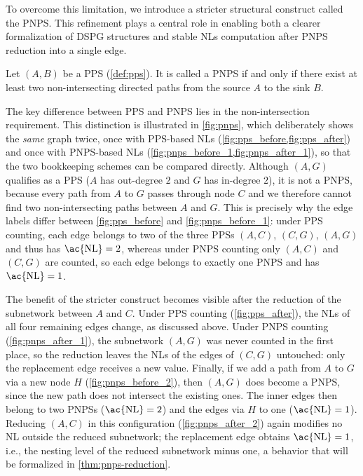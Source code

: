 To overcome this limitation, we introduce a stricter structural construct called the \acf{PNPS}. This refinement plays a central role in enabling both a clearer formalization of \ac{DSPG} structures and stable \acp{NL} computation after \ac{PNPS} reduction into a single edge.

\begin{definition}
\label{def:pnps}
Let $(A,B)$ be a \ac{PPS} (\cref{def:pps}). It is called a \ac{PNPS} if and only if there exist at least two non-intersecting directed paths from the source $A$ to the sink $B$.
\end{definition}
The key difference between \ac{PPS} and \ac{PNPS} lies in the non-intersection requirement. This distinction is illustrated in \cref{fig:pnps}, which deliberately shows the \emph{same} graph twice, once with \ac{PPS}-based \acp{NL} (\cref{fig:pps_before,fig:pps_after}) and once with \ac{PNPS}-based \acp{NL} (\cref{fig:pnps_before_1,fig:pnps_after_1}), so that the two bookkeeping schemes can be compared directly. Although $(A,G)$ qualifies as a \ac{PPS} ($A$ has out-degree $2$ and $G$ has in-degree $2$), it is not a \ac{PNPS}, because every path from $A$ to $G$ passes through node $C$ and we therefore cannot find two non-intersecting paths between $A$ and $G$. This is precisely why the edge labels differ between \cref{fig:pps_before} and \cref{fig:pnps_before_1}: under \ac{PPS} counting, each edge belongs to two of the three \acp{PPS} $(A,C)$, $(C,G)$, $(A,G)$ and thus has $\text{\ac{NL}} = 2$, whereas under \ac{PNPS} counting only $(A,C)$ and $(C,G)$ are counted, so each edge belongs to exactly one \ac{PNPS} and has $\text{\ac{NL}} = 1$.

The benefit of the stricter construct becomes visible after the reduction of the subnetwork between $A$ and $C$. Under \ac{PPS} counting (\cref{fig:pps_after}), the \acp{NL} of all four remaining edges change, as discussed above. Under \ac{PNPS} counting (\cref{fig:pnps_after_1}), the subnetwork $(A,G)$ was never counted in the first place, so the reduction leaves the \acp{NL} of the edges of $(C,G)$ untouched: only the replacement edge receives a new value. Finally, if we add a path from $A$ to $G$ via a new node $H$ (\cref{fig:pnps_before_2}), then $(A,G)$ does become a \ac{PNPS}, since the new path does not intersect the existing ones. The inner edges then belong to two \acp{PNPS} ($\text{\ac{NL}} = 2$) and the edges via $H$ to one ($\text{\ac{NL}} = 1$). Reducing $(A,C)$ in this configuration (\cref{fig:pnps_after_2}) again modifies no \ac{NL} outside the reduced subnetwork; the replacement edge obtains $\text{\ac{NL}} = 1$, i.e., the nesting level of the reduced subnetwork minus one, a behavior that will be formalized in \cref{thm:pnps-reduction}.


